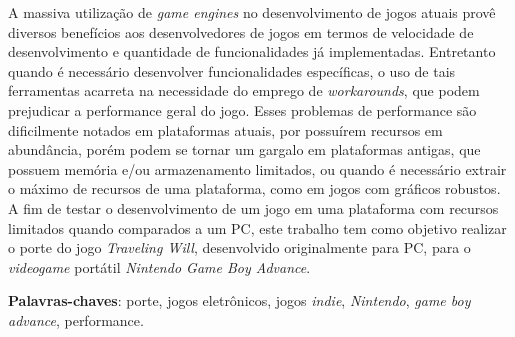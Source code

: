 \begin{resumo}

A massiva utilização de \textit{game engines} no desenvolvimento de jogos atuais provê diversos benefícios aos desenvolvedores de jogos em termos de velocidade de desenvolvimento e quantidade de funcionalidades já implementadas. Entretanto quando é necessário desenvolver funcionalidades específicas, o uso de tais ferramentas acarreta na necessidade do emprego de \textit{workarounds}, que podem prejudicar a performance geral do jogo. Esses problemas de performance são dificilmente notados em plataformas atuais, por possuírem recursos em abundância, porém podem se tornar um gargalo em plataformas antigas, que possuem memória e/ou armazenamento limitados, ou quando é necessário extrair o máximo de recursos de uma plataforma, como em jogos com gráficos robustos. A fim de testar o desenvolvimento de um jogo em uma plataforma com recursos limitados quando comparados a um PC, este trabalho tem como objetivo realizar o porte do jogo \textit{Traveling Will}, desenvolvido originalmente para PC, para o \textit{videogame} portátil \textit{Nintendo Game Boy Advance}.

 \vspace{\onelineskip}

 \noindent
 \textbf{Palavras-chaves}: porte, jogos eletrônicos, jogos \textit{indie}, \textit{Nintendo}, \textit{game boy advance}, performance.
\end{resumo}
